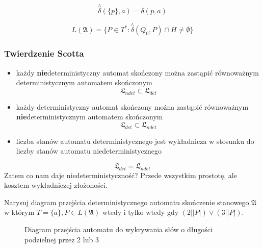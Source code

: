 \documentclass{../notatki}
\begin{document}
$$
\stackrel{\wedge}{\delta}(\{p\}, a) = \delta(p, a)
$$

$$
L(\mathfrak{A}) = \{P \in T^* : \stackrel{\wedge}{\delta}(Q_0, P)
\cap H \ne \emptyset\}
$$

\subsubsection{Twierdzenie Scotta}

\begin{itemize}
  \item każdy \textbf{nie}deterministyczny automat skończony można
    zastąpić równoważnym deterministycznym automatem skończonym
    $$\mathfrak{L}_{ndet} \subset \mathfrak{L}_{det}$$
  \item każdy deterministyczny automat skończony można zastąpić
    równoważnym \textbf{nie}deterministycznym automatem skończonym
    $$\mathfrak{L}_{det} \subset \mathfrak{L}_{ndet}$$
  \item liczba stanów automatu deterministycznego jest wykładnicza w
    stosunku do liczby stanów automatu niedeterministycznego
\end{itemize}

$$\mathfrak{L}_{det} = \mathfrak{L}_{ndet}$$
Zatem co nam daje niedeterministyczność? Przede wszystkim prostotę,
ale kosztem wykładniczej złożoności.

Narysuj diagram przejścia deterministycznego automatu skończenie
stanowego $\mathfrak{A}$ w którym $T=\{a\}, P \in L(\mathfrak{A})$
wtedy i tylko wtedy gdy $(2 | |P|) \vee (3 | |P|)$.

\begin{figure}[H]
  \centering
  \caption{Diagram przejścia automatu do wykrywania słów o długości
  podzielnej przez 2 lub 3}
  \label{fig:automat:2or3}
\end{figure}
\end{document}
